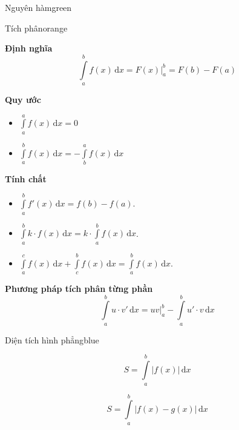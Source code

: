 \documentclass[12pt,a4paper,landscape]{book}
\begin{document}
\begin{multicols*}{3}
\begin{khung_trello}{Nguyên hàm}{green}
\begin{khung_trello_box}
			\end{khung_trello_box}
		\end{khung_trello}
		\begin{khung_trello}{Tích phân}{orange}
			\begin{khung_trello_box}
				\textbf{\color{trello_bg_orange}Định nghĩa}
				$$\displaystyle\int\limits_{a}^{b}f(x)\mathrm{\,d}x=F(x)\bigg|_a^b=F(b)-F(a)$$
			\end{khung_trello_box}
			\begin{khung_trello_box}
				\textbf{\color{trello_bg_orange}Quy ước}
				\begin{itemize}[leftmargin=5mm]
					\item $\displaystyle\int\limits_{a}^{a}f(x)\mathrm{\,d}x=0$
					\item $\displaystyle\int\limits_{a}^{b}f(x)\mathrm{\,d}x=-\int\limits_{b}^{a}f(x)\mathrm{\,d}x$
				\end{itemize}
			\end{khung_trello_box}
			\begin{khung_trello_box}
				\textbf{\color{trello_bg_orange}Tính chất}
				\begin{itemize}[leftmargin=5mm]
					\item $\displaystyle\int\limits_{a}^{b}f'(x)\mathrm{\,d}x=f(b)-f(a)$.
					\item $\displaystyle\int\limits_{a}^{b}k\cdot f(x)\mathrm{\,d}x=k\cdot\int\limits_{a}^{b}f(x)\mathrm{\,d}x$.
					\item $\displaystyle\int\limits_{a}^{c}f(x)\mathrm{\,d}x+\int\limits_{c}^{b}f(x)\mathrm{\,d}x=\int\limits_{a}^{b}f(x)\mathrm{\,d}x$.
				\end{itemize}
			\end{khung_trello_box}
			\begin{khung_trello_box}
				\textbf{\color{trello_bg_orange}Phương pháp tích phân từng phần}
				$$\displaystyle\int\limits_{a}^{b}u\cdot v'\mathrm{\,d}x=uv\bigg|_a^b-\int\limits_{a}^{b}u'\cdot v\mathrm{\,d}x$$
			\end{khung_trello_box}
		\end{khung_trello}
		\vfill\null
		\columnbreak
		\begin{khung_trello}{Diện tích hình phẳng}{blue}
			\begin{khung_trello_box}
				$$S=\displaystyle\int\limits_{a}^{b}\big|f(x)\big|\mathrm{\,d}x$$
			\end{khung_trello_box}
			\begin{khung_trello_box}
				$$S=\displaystyle\int\limits_{a}^{b}\big|f(x)-g(x)\big|\mathrm{\,d}x$$

\end{khung_trello_box}
\end{khung_trello}
\end{multicols*}
\end{document}
